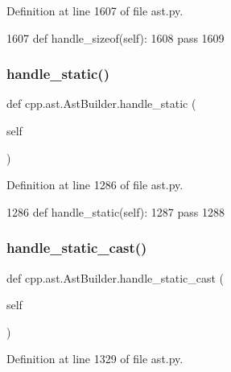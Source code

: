 Definition at line 1607 of file ast.\+py.


\begin{DoxyCode}
1607     \textcolor{keyword}{def }handle\_sizeof(self):
1608         \textcolor{keywordflow}{pass}
1609 
\end{DoxyCode}
\mbox{\label{classcpp_1_1ast_1_1AstBuilder_ad98bc262537d2882adc2017023cef6aa}} 
\subsubsection{\texorpdfstring{handle\+\_\+static()}{handle\_static()}}
{\footnotesize\ttfamily def cpp.\+ast.\+Ast\+Builder.\+handle\+\_\+static (\begin{DoxyParamCaption}\item[{}]{self }\end{DoxyParamCaption})}



Definition at line 1286 of file ast.\+py.


\begin{DoxyCode}
1286     \textcolor{keyword}{def }handle\_static(self):
1287         \textcolor{keywordflow}{pass}
1288 
\end{DoxyCode}
\mbox{\label{classcpp_1_1ast_1_1AstBuilder_ab7577b3a2bd22c1bccb656493de379f3}} 
\subsubsection{\texorpdfstring{handle\+\_\+static\+\_\+cast()}{handle\_static\_cast()}}
{\footnotesize\ttfamily def cpp.\+ast.\+Ast\+Builder.\+handle\+\_\+static\+\_\+cast (\begin{DoxyParamCaption}\item[{}]{self }\end{DoxyParamCaption})}



Definition at line 1329 of file ast.\+py.


